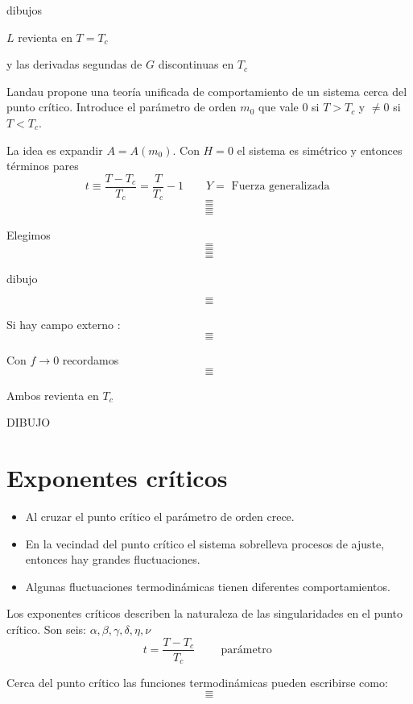 \documentclass[10pt,oneside]{CBFT_book}
\begin{document}
dibujos

$L$ revienta en $T=T_c$


y las derivadas segundas de $G$ discontinuas en $T_c$

Landau propone una teoría unificada de comportamiento de un sistema cerca del punto crítico.
Introduce el parámetro de orden $m_0$ que vale 0 si $T>T_c$ y $\neq 0$ si $T<T_c$.

La idea es expandir $ A = A(m_0) $.
Con $H=0$ el sistema es simétrico y entonces términos pares
\[
	t \equiv \frac{T-T_c}{T_c} = \frac{T}{T_c} -1  \qquad Y = \text{ Fuerza generalizada }
\]
\[=\]
\[=\]
\[=\]
\[=\]

Elegimos
\[=\]
\[=\]
\[=\]
\[=\]

dibujo

\[=\]
\[=\]

Si hay campo externo :
\[=\]
\[=\]

Con $f \to 0$ recordamos
\[=\]
\[=\]

Ambos revienta en $T_c$

DIBUJO

\section{Exponentes críticos}

\begin{itemize}
 \item Al cruzar el punto crítico el parámetro de orden crece.
 \item En la vecindad del punto crítico el sistema sobrelleva procesos de ajuste, entonces
 hay grandes fluctuaciones.
 \item Algunas fluctuaciones termodinámicas tienen diferentes comportamientos.
\end{itemize}

Los exponentes críticos describen la naturaleza de las singularidades en el punto crítico.
Son seis: $ \alpha, \beta, \gamma, \delta, \eta, \nu $
\[
	t = \frac{T-T_c}{T_c} \qquad \text{ parámetro } 
\]

Cerca del punto crítico las funciones termodinámicas pueden escribirse como:
\[=\]
\[=\]
\end{document}
